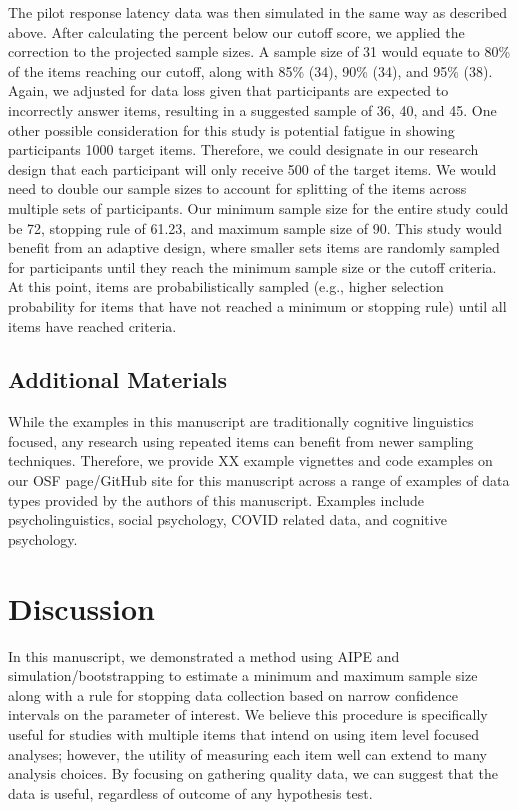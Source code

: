 \documentclass[
  man]{apa6}
\begin{document}
The pilot response latency data was then simulated in the same way as described above. After calculating the percent below our cutoff score, we applied the correction to the projected sample sizes. A sample size of 31 would equate to 80\% of the items reaching our cutoff, along with 85\% (34), 90\% (34), and 95\% (38). Again, we adjusted for data loss given that participants are expected to incorrectly answer items, resulting in a suggested sample of 36, 40, and 45. One other possible consideration for this study is potential fatigue in showing participants 1000 target items. Therefore, we could designate in our research design that each participant will only receive 500 of the target items. We would need to double our sample sizes to account for splitting of the items across multiple sets of participants. Our minimum sample size for the entire study could be 72, stopping rule of 61.23, and maximum sample size of 90. This study would benefit from an adaptive design, where smaller sets items are randomly sampled for participants until they reach the minimum sample size or the cutoff criteria. At this point, items are probabilistically sampled (e.g., higher selection probability for items that have not reached a minimum or stopping rule) until all items have reached criteria.

\hypertarget{additional-materials}{%
\subsection{Additional Materials}\label{additional-materials}}

While the examples in this manuscript are traditionally cognitive linguistics focused, any research using repeated items can benefit from newer sampling techniques. Therefore, we provide XX example vignettes and code examples on our OSF page/GitHub site for this manuscript across a range of examples of data types provided by the authors of this manuscript. Examples include psycholinguistics, social psychology, COVID related data, and cognitive psychology.

\hypertarget{discussion}{%
\section{Discussion}\label{discussion}}

In this manuscript, we demonstrated a method using AIPE and simulation/bootstrapping to estimate a minimum and maximum sample size along with a rule for stopping data collection based on narrow confidence intervals on the parameter of interest. We believe this procedure is specifically useful for studies with multiple items that intend on using item level focused analyses; however, the utility of measuring each item well can extend to many analysis choices. By focusing on gathering quality data, we can suggest that the data is useful, regardless of outcome of any hypothesis test.
\end{document}
